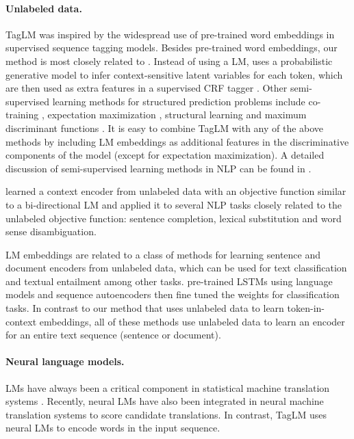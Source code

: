 \documentclass[11pt,a4paper]{article}
\begin{document}
\paragraph{Unlabeled data.}
TagLM was inspired by the widespread use of pre-trained word embeddings in supervised sequence tagging models. 
Besides pre-trained word embeddings, our method is most closely related to \citet{li:05}.
Instead of using a LM, \citet{li:05} uses a probabilistic generative model to infer context-sensitive latent variables for each token, which are then used as extra features in a supervised CRF tagger \citep{CRF:Lafferty2001}.
Other semi-supervised learning methods for structured prediction problems include co-training \citep{blum:98,pierce:01}, expectation maximization \citep{nigam:00,mohit:05}, structural learning \citep{ando:05} and maximum discriminant functions \citep{suzuki:07,suzuki:08}.
It is easy to combine TagLM with any of the above methods by including LM embeddings as additional features in the discriminative components of the model (except for expectation maximization).
A detailed discussion of semi-supervised learning methods in NLP can be found in \cite{sogaard:13}.

\citet{Melamud2016context2vecLG} learned a context encoder from unlabeled data with an objective function similar to a bi-directional LM and applied
it to several NLP tasks closely related to the unlabeled objective function: sentence completion, lexical substitution and word sense disambiguation.



LM embeddings are related to a class of methods \citep[e.g.,][]{Le2014DistributedRO,Kiros2015SkipThoughtV,Hill2016LearningDR} for learning sentence and document encoders from unlabeled data, which can be used for text classification and textual entailment among other tasks.  \citet{Dai2015SemisupervisedSL} pre-trained LSTMs using language models and sequence autoencoders then fine tuned the weights for classification tasks.  In contrast to our method that uses unlabeled data to learn token-in-context embeddings, all of these methods use unlabeled data to learn an encoder for an entire text sequence (sentence or document).

\paragraph{Neural language models.}
LMs have always been a critical component in statistical machine translation systems \citep{koehn:09}.
Recently, neural LMs \citep{bengio:03,mikolov:10} have also been integrated in neural machine translation systems \citep[e.g.,][]{kalchbrenner:13,devlin:14} to score candidate translations.
In contrast, TagLM uses neural LMs to encode words in the input sequence.
\end{document}
